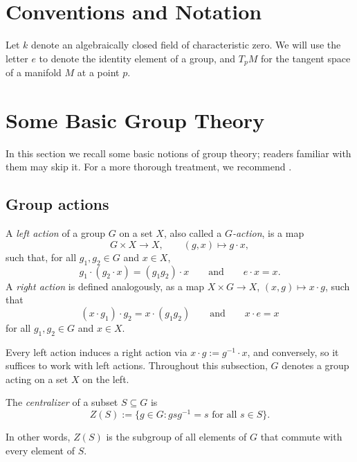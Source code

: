 \section{Conventions and Notation}

Let $k$ denote an algebraically closed field of characteristic zero. We will use the letter $e$ to denote the identity element of a group, and $T_pM$ for the tangent space of a manifold $M$ at a point $p$.




\section{Some Basic Group Theory}

In this section we recall some basic notions of group theory; readers familiar with them may skip it. For a more thorough treatment, we recommend \cite{Hungerford2003-rt, zariskiCommutativeAlgebra1986,kemperCourseCommutativeAlgebra2011}.

\subsection{Group actions}


\begin{definition}
    A \emph{left action} of a group $G$ on a set $X$, also called a \emph{$G$-action}, is a map
    \[
        G \times X \to X, \qquad (g, x) \mapsto g \cdot x,
    \]
    such that, for all $g_1, g_2 \in G$ and $x \in X$,
    \[
        g_1 \cdot (g_2 \cdot x) = (g_1 g_2) \cdot x \qquad \text{and} \qquad e \cdot x = x.
    \]
    A \emph{right action} is defined analogously, as a map $X \times G \to X$, $(x, g) \mapsto x \cdot g$, such that
    \[
        (x \cdot g_1) \cdot g_2 = x \cdot (g_1 g_2) \qquad \text{and} \qquad x \cdot e = x
    \]
    for all $g_1, g_2 \in G$ and $x \in X$.
\end{definition}

Every left action induces a right action via $x \cdot g := g^{-1} \cdot x$, and conversely, so it suffices to work with left actions. Throughout this subsection, $G$ denotes a group acting on a set $X$ on the left.


\begin{definition}
    The \emph{centralizer} of a subset $S \subseteq G$ is
    \[
        Z(S) := \{ g \in G : gsg^{-1} = s \text{ for all } s \in S \}.
    \]
\end{definition}

In other words, $Z(S)$ is the subgroup of all elements of $G$ that commute with every element of $S$.


